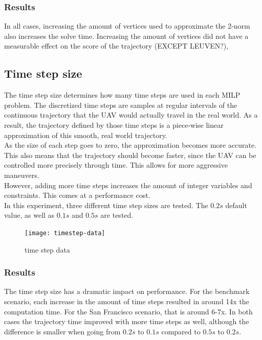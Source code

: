 \subsubsection{Results}
In all cases, increasing the amount of vertices used to approximate the 2-norm also increases the solve time. Increasing the amount of vertices did not have a measurable effect on the score of the trajectory (EXCEPT LEUVEN?), 

\clearpage
\subsection{Time step size}
\label{subsec:timestep}
The time step size determines how many time steps are used in each MILP problem. The discretized time steps are samples at regular intervals of the continuous trajectory that the UAV would actually travel in the real world. As a result, the trajectory defined by those time steps is a piece-wise linear approximation of this smooth, real world trajectory. \\
As the size of each step goes to zero, the approximation becomes more accurate. This also means that the trajectory should become faster, since the UAV can be controlled more precisely through time. This allows for more aggressive maneuvers. \\
However, adding more time steps increases the amount of integer variables and constraints. This comes at a performance cost. \\
In this experiment, three different time step sizes are tested. The $0.2s$ default value, as well as $0.1s$ and $0.5s$ are tested.
\begin{figure}[]
	\centering
	\texttt{[image: timestep-data]}
	\caption{time step data}
	\label{fig:timestep-data}
\end{figure}
\subsubsection{Results}
The time step size has a dramatic impact on performance. For the benchmark scenario, each increase in the amount of time steps resulted in around 14x the computation time. For the San Francisco scenario, that is around 6-7x. In both cases the trajectory time improved with more time steps as well, although the difference is smaller when going from $0.2s$ to $0.1s$ compared to $0.5s$ to $0.2s$.






\clearpage

